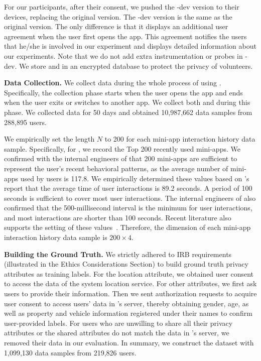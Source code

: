 For our participants, after their consent, we pushed the \alipay-dev version to their devices, replacing the original version. The
\alipay-dev version is the same as the original version. The only difference is that it displays an additional user agreement when the user first opens the app. This agreement notifies the users that he/she is involved in our experiment and displays detailed information about our experiments. Note that we do not add extra instrumentation or probes in \alipay-dev. We store \mini and \op in an encrypted database to protect the privacy of volunteers.



\noindent \textbf{Data Collection.}
We collect data during the whole process of using \alipay. Specifically, the
collection phase starts when the user opens the app and ends when the user exits
\alipay or switches to another app. We collect both \mini and \op during this phase. We collected data for 50 days and obtained 10,987,662 data samples from 288,895 users. 



We empirically set the length $N$ to 200 for each mini-app interaction history data sample. Specifically, for \mini, we record the Top 200 recently used mini-apps. We confirmed with the internal engineers of \alipay that 200 mini-apps
are sufficient to represent the user's recent behavioral patterns, as the
average number of mini-apps used by \alipay users is 117.8.
We empirically determined these values based on \alipay's report that the average time of user interactions is 89.2 seconds. A period of 100 seconds is sufficient to cover most
user interactions. The internal engineers of \alipay also confirmed that the
500-millisecond interval is the minimum for user interactions, and most
interactions are shorter than 100 seconds. Recent literature also supports the setting of these values~\cite{10.1145/2750858.2805837,10.1145/3604271}. Therefore, the
dimension of each mini-app interaction history data sample is $200 \times 4$. 



\noindent \textbf{Building the Ground Truth.} 
We strictly adhered to IRB requirements (illustrated in the Ethics Considerations
Section) to build ground truth privacy attributes as training labels.
For the location attribute, we obtained user consent to access the data of the system
location service. For other attributes, we first ask users to provide their
information. Then we sent authorization requests to acquire user consent to
access users' data in \alipay's server, thereby obtaining
gender, age, as well as property and vehicle information registered under their
names to confirm user-provided labels. 
For users who are unwilling to share all
their privacy attributes or the shared attributes do not match the data in \alipay's server,
we removed their data in our evaluation. In summary, we construct the dataset with 1,099,130 data samples from 219,826 users.



